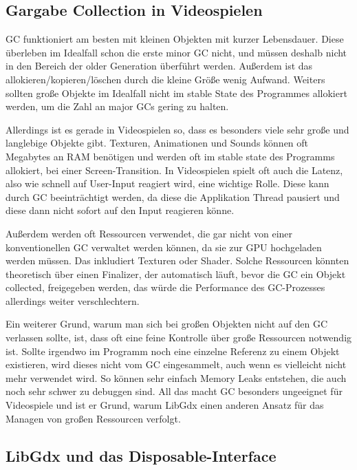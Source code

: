 \subsection{Gargabe Collection in Videospielen}

GC funktioniert am besten mit kleinen Objekten mit kurzer Lebensdauer.
Diese überleben im Idealfall schon die erste minor GC nicht, und müssen deshalb nicht in den Bereich der older
Generation überführt werden.
Außerdem ist das allokieren/kopieren/löschen durch die kleine Größe wenig Aufwand.
Weiters sollten große Objekte im Idealfall nicht im stable State des Programmes allokiert werden, um die Zahl an major
GCs gering zu halten.

Allerdings ist es gerade in Videospielen so, dass es besonders viele sehr große und langlebige Objekte gibt.
Texturen, Animationen und Sounds können oft Megabytes an RAM benötigen und werden oft im stable state des Programms
allokiert, \zB bei einer Screen-Transition.
In Videospielen spielt oft auch die Latenz, also wie schnell auf User-Input reagiert wird, eine wichtige Rolle.
Diese kann durch GC beeinträchtigt werden, da diese die Applikation Thread pausiert und diese dann nicht sofort auf
den Input reagieren könne.

Außerdem werden oft Ressourcen verwendet, die gar nicht von einer konventionellen GC verwaltet werden können, da sie zur
GPU hochgeladen werden müssen.
Das inkludiert \zB Texturen oder Shader.
Solche Ressourcen könnten theoretisch über einen Finalizer, der automatisch läuft, bevor die GC ein Objekt collected,
freigegeben werden, das würde die Performance des GC-Prozesses allerdings weiter verschlechtern.

Ein weiterer Grund, warum man sich bei großen Objekten nicht auf den GC verlassen sollte, ist, dass oft eine feine
Kontrolle über große Ressourcen notwendig ist.
Sollte irgendwo im Programm noch eine einzelne Referenz zu einem Objekt existieren, wird dieses nicht vom GC
eingesammelt, auch wenn es vielleicht nicht mehr verwendet wird.
So können sehr einfach Memory Leaks entstehen, die auch noch sehr schwer zu debuggen sind.
All das macht GC besonders ungeeignet für Videospiele und ist er Grund, warum LibGdx einen anderen Ansatz für das
Managen von großen Ressourcen verfolgt.

\subsection{LibGdx und das Disposable-Interface}

